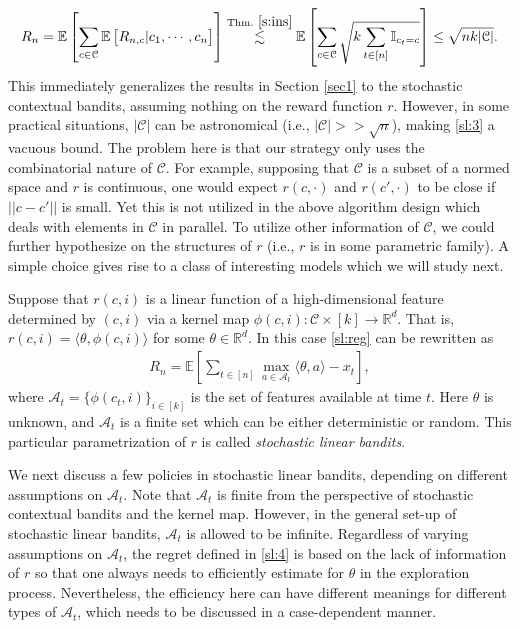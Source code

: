\documentclass[10pt,a4article]{amsart}
\numberwithin{equation}{section}
\theoremstyle{plain}
\theoremstyle{definition}
\def\R{{\mathbb R}}
\def\E{{\mathbb E}}
\def\R{{\mathbb R}}
\def\t{{\theta}}
\begin{document}
\begin{align}
R_n=\E\left[\sum_{c\in\mathcal C}\E\left[R_{n,c}|c_1, \cdots, c_n\right]\right]\stackrel{\text{Thm.}\ \ref{s:ins}}{\lesssim}\E\left[\sum_{c\in\mathcal C}\sqrt{k\sum_{t\in [n]}\mathbb I_{c_t = c}}\right]\leq\sqrt{nk|\mathcal C|}.\label{sl:3}
\end{align} 
This immediately generalizes the results in Section \ref{sec1} to the stochastic contextual bandits, assuming nothing on the reward function $r$. However, in some practical situations, $|\mathcal C|$ can be astronomical (i.e., $|\mathcal C|>>\sqrt{n}$), making \eqref{sl:3} a vacuous bound.  The problem here is that our strategy only uses the combinatorial nature of $\mathcal C$. For example, supposing that $\mathcal C$ is a subset of a normed space and $r$ is continuous, one would expect $r(c, \cdot)$ and $r(c', \cdot)$ to be close if $||c-c'||$ is small. Yet this is not utilized in the above algorithm design which deals with elements in $\mathcal C$ in parallel. To utilize other information of $\mathcal C$, we could further hypothesize on the structures of $r$ (i.e., $r$ is in some parametric family). A simple choice gives rise to a class of interesting models which we will study next. 

Suppose that $r(c,i)$ is a linear function of a high-dimensional feature determined by $(c, i)$ via a kernel map $\phi(c,i): \mathcal C\times [k]\to\R^d$. That is, $r(c, i) = \langle\t, \phi(c,i) \rangle$ for some $\t\in\R^d$. In this case \eqref{sl:reg} can be rewritten as 
\begin{align}
R_n = \E\left[\sum_{t\in [n]}\max_{a\in\mathcal A_t}\langle\theta, a\rangle-x_{t}\right],\label{sl:4}
\end{align}  
where $\mathcal A_t = \{\phi(c_t, i)\}_{i\in [k]}$ is the set of features available at time $t$. Here $\theta$ is unknown, and $\mathcal A_t$ is a finite set which can be either deterministic or random. This particular parametrization of $r$ is called \emph{stochastic linear bandits}. 

We next discuss a few policies in stochastic linear bandits, depending on different assumptions on $\mathcal A_t$. Note that $\mathcal A_t$ is finite from the perspective of stochastic contextual bandits and the kernel map. However, in the general set-up of stochastic linear bandits, $\mathcal A_t$ is allowed to be infinite. Regardless of varying assumptions on $\mathcal A_t$, the regret defined in \eqref{sl:4} is based on the lack of information of $r$ so that one always needs to efficiently estimate for $\theta$ in the exploration process. Nevertheless, the efficiency here can have different meanings for different types of $\mathcal A_t$, which needs to be discussed in a case-dependent manner. 
\end{document}
